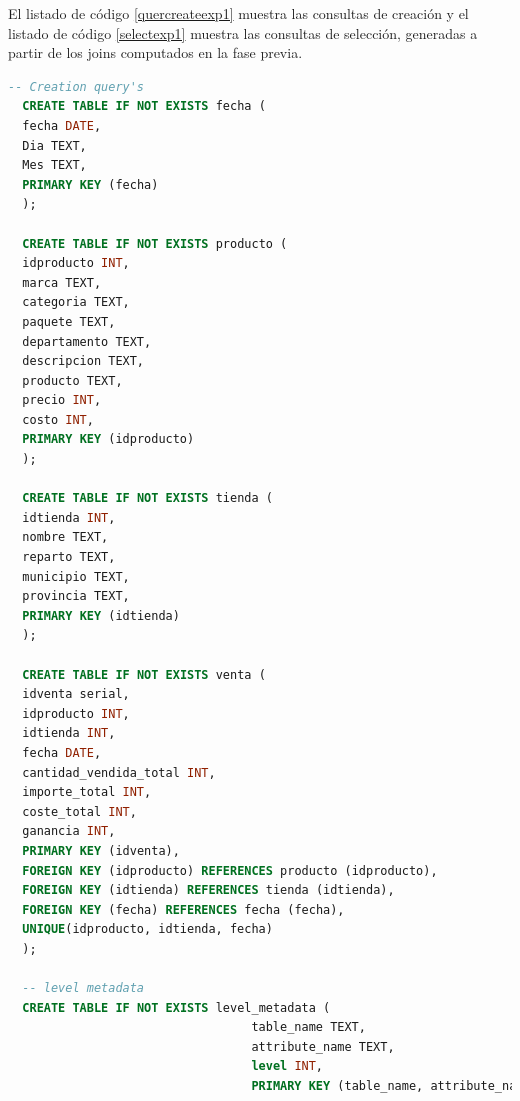 El listado de código \ref{quercreateexp1} muestra las consultas de creación y el listado de código 
\ref{selectexp1} muestra las consultas de selección, generadas a partir de los joins computados en 
la fase previa.

\begin{lstlisting}[label={quercreateexp1}, caption={Consultas de creaci\'on generadas para el experimento 1}, language={sql}]
  -- Creation query's
  CREATE TABLE IF NOT EXISTS fecha (
  fecha DATE, 
  Dia TEXT, 
  Mes TEXT, 
  PRIMARY KEY (fecha)
  );

  CREATE TABLE IF NOT EXISTS producto (
  idproducto INT, 
  marca TEXT, 
  categoria TEXT, 
  paquete TEXT, 
  departamento TEXT, 
  descripcion TEXT, 
  producto TEXT, 
  precio INT, 
  costo INT, 
  PRIMARY KEY (idproducto)
  );

  CREATE TABLE IF NOT EXISTS tienda (
  idtienda INT, 
  nombre TEXT, 
  reparto TEXT, 
  municipio TEXT, 
  provincia TEXT, 
  PRIMARY KEY (idtienda)
  );

  CREATE TABLE IF NOT EXISTS venta (
  idventa serial, 
  idproducto INT, 
  idtienda INT, 
  fecha DATE, 
  cantidad_vendida_total INT, 
  importe_total INT, 
  coste_total INT, 
  ganancia INT, 
  PRIMARY KEY (idventa), 
  FOREIGN KEY (idproducto) REFERENCES producto (idproducto), 
  FOREIGN KEY (idtienda) REFERENCES tienda (idtienda), 
  FOREIGN KEY (fecha) REFERENCES fecha (fecha), 
  UNIQUE(idproducto, idtienda, fecha)
  );

  -- level metadata
  CREATE TABLE IF NOT EXISTS level_metadata (
                                  table_name TEXT,
                                  attribute_name TEXT,
                                  level INT,
                                  PRIMARY KEY (table_name, attribute_name, level));


\end{lstlisting}
